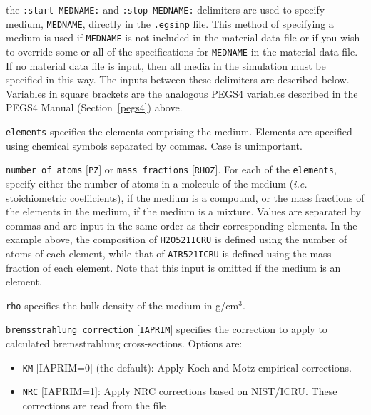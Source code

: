 \documentclass[12pt,twoside]{article}  %
\begin{document}
\begin{description}
\item the {\tt :start MEDNAME:} and {\tt :stop MEDNAME:} delimiters are used to specify medium, {\tt MEDNAME}, directly in the
{\tt .egsinp} file.  This method of specifying a medium is used if {\tt MEDNAME} is not included in the material data file or
if you wish to override some or all of the specifications for {\tt MEDNAME} in the material data file.
If no material data file is input, then all media in the simulation
must be specified in this way.  The inputs between these delimiters are described below.  Variables
in square brackets are the analogous PEGS4 variables described in the PEGS4 Manual (Section~\ref{pegs4}) above.
\begin{description}
\item {\tt elements} specifies the elements comprising the medium.  Elements are specified using chemical symbols separated by
commas.  Case is unimportant.
\item {\tt number of atoms} $[${\tt PZ}$]$ or {\tt mass fractions} $[${\tt RHOZ}$]$.  For each of the {\tt elements}, specify either the number of atoms in a molecule of the medium ({\it i.e.} stoichiometric coefficients), if the
medium is a compound, or the mass fractions of the elements in the medium,
if the medium is a mixture.
Values are separated by commas and are input in the same order as their corresponding elements.  In the example above,
the composition of {\tt H2O521ICRU} is
defined using the number of atoms of each element, while that of {\tt AIR521ICRU} is defined using the mass fraction of each element.  Note that this input
is omitted if the medium is an element.
\item {\tt rho} specifies the bulk density of the medium in g/cm$^3$.
\item {\tt bremsstrahlung correction} $[${\tt IAPRIM}$]$ specifies the
correction to apply to calculated bremsstrahlung cross-sections.
Options are:
\begin{itemize}
\item {\tt KM} $[$IAPRIM=0$]$ (the default): Apply Koch and Motz\cite{KM59} empirical corrections.
\item {\tt NRC} $[$IAPRIM=1$]$: Apply NRC corrections based on NIST/ICRU\cite{Ro89a}.  These corrections are read from the file

\end{itemize}
\end{description}
\end{description}
\end{document}
